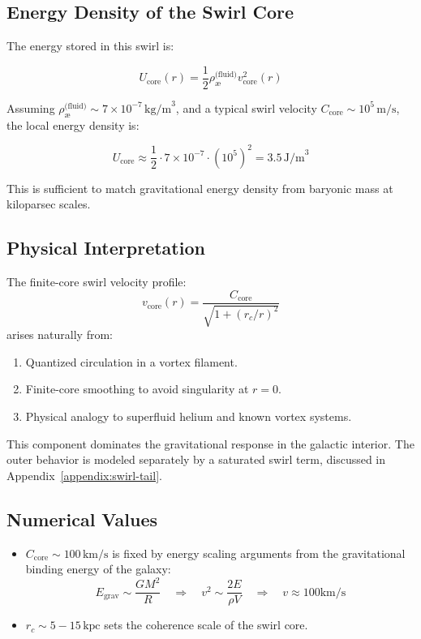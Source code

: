 \documentclass[12pt]{article}
\begin{document}
\subsection{Energy Density of the Swirl Core}

The energy stored in this swirl is:

\[
U_{\text{core}}(r) = \frac{1}{2} \rho_{\text{\ae}}^{\text{(fluid)}} v_\text{core}^2(r)
\]

Assuming \( \rho_{\text{\ae}}^{\text{(fluid)}} \sim 7 \times 10^{-7}\, \text{kg/m}^3 \), and a typical swirl velocity \( C_{\text{core}} \sim 10^5\, \text{m/s} \), the local energy density is:

\[
U_{\text{core}} \approx \frac{1}{2} \cdot 7 \times 10^{-7} \cdot (10^5)^2 = 3.5\, \text{J/m}^3
\]

This is sufficient to match gravitational energy density from baryonic mass at kiloparsec scales.

\subsection{Physical Interpretation}

The finite-core swirl velocity profile:
\[
\boxed{
v_\text{core}(r) = \frac{C_{\text{core}}}{\sqrt{1 + (r_c/r)^2}}
}
\]
arises naturally from:
\begin{enumerate}
    \item Quantized circulation in a vortex filament.
    \item Finite-core smoothing to avoid singularity at \( r = 0 \).
    \item Physical analogy to superfluid helium and known vortex systems.
\end{enumerate}

This component dominates the gravitational response in the galactic interior. The outer behavior is modeled separately by a saturated swirl term, discussed in Appendix~\ref{appendix:swirl-tail}.

\subsection{Numerical Values}

\begin{itemize}
    \item \( C_{\text{core}} \sim 100\,\text{km/s} \) is fixed by energy scaling arguments from the gravitational binding energy of the galaxy:
    \[
    E_{\text{grav}} \sim \frac{GM^2}{R} \quad \Rightarrow \quad v^2 \sim \frac{2E}{\rho V} \quad \Rightarrow \quad v \approx 100 \text{km/s}
    \]
    \item \( r_c \sim 5 - 15\,\text{kpc} \) sets the coherence scale of the swirl core.
\end{itemize}
\end{document}
